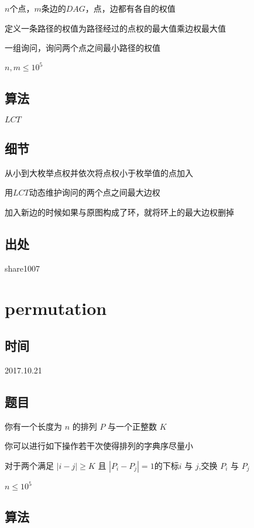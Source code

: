\documentclass[a4paper]{article}
\begin{document}
		$n$个点，$m$条边的$DAG$，点，边都有各自的权值
		
		定义一条路径的权值为路径经过的点权的最大值乘边权最大值
		
		一组询问，询问两个点之间最小路径的权值
		
		$n,m \leq 10^5$
		
	\subsection{算法}
		
		$LCT$
		
	\subsection{细节}
		
		从小到大枚举点权并依次将点权小于枚举值的点加入
		
		用$LCT$动态维护询问的两个点之间最大边权
		
		加入新边的时候如果与原图构成了环，就将环上的最大边权删掉
		
	\subsection{出处}
		
		share1007
	
	\newpage
	
	\section{permutation}
		
	\subsection{时间}
		
		2017.10.21
		
	\subsection{题目}
		
		你有一个长度为 $n$ 的排列 $P$ 与一个正整数 $K$
		
		你可以进行如下操作若干次使得排列的字典序尽量小
		
		对于两个满足 $|i − j| \geq K$ 且 $|P_i - P_j| = 1$的下标$ i$ 与 $j$,交换 $P _i$ 与 $P_ j$
		
		$n \leq 10^5$
		
	\subsection{算法}
		
\end{document}
